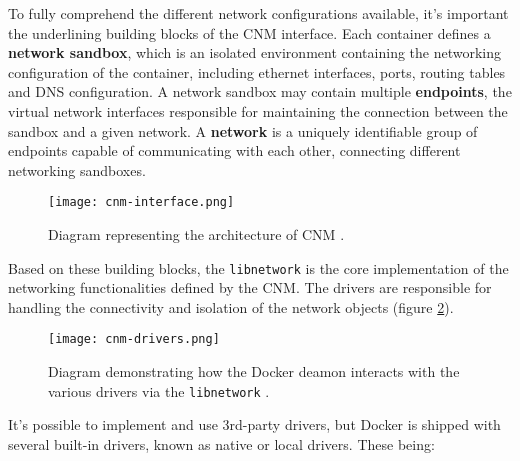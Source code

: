 To fully comprehend the different network configurations available, it's important the underlining building blocks of the \ac{CNM} interface. Each container defines a \textbf{network sandbox}, which is an isolated environment containing the networking configuration of the container, including ethernet interfaces, ports, routing tables and \acs{DNS} configuration. A network sandbox may contain multiple \textbf{endpoints}, the virtual network interfaces responsible for maintaining the connection between the sandbox and a given network. A \textbf{network} is a uniquely identifiable group of endpoints capable of communicating with each other, connecting different networking sandboxes.

\begin{figure}[!htb]
    \centering
    \texttt{[image: cnm-interface.png]}
    \caption{Diagram representing the architecture of \ac{CNM} \cite{fig-src:cnm}.}
    \label{fig:cnm-interface}
\end{figure}

Based on these building blocks, the \texttt{libnetwork} is the core implementation of the networking functionalities defined by the \ac{CNM}. The drivers are responsible for handling the connectivity and isolation of the network objects (figure \ref{fig:cnm-drivers}).

\begin{figure}[!htb]
    \centering
    \texttt{[image: cnm-drivers.png]}
    \caption{Diagram demonstrating how the Docker deamon interacts with the various drivers via the \texttt{libnetwork} \cite{fig-src:cnm}.}
    \label{fig:cnm-drivers}
\end{figure}

It's possible to implement and use 3rd-party drivers, but Docker is shipped with several built-in drivers, known as native or local drivers\cite{network-drivers}. These being:

